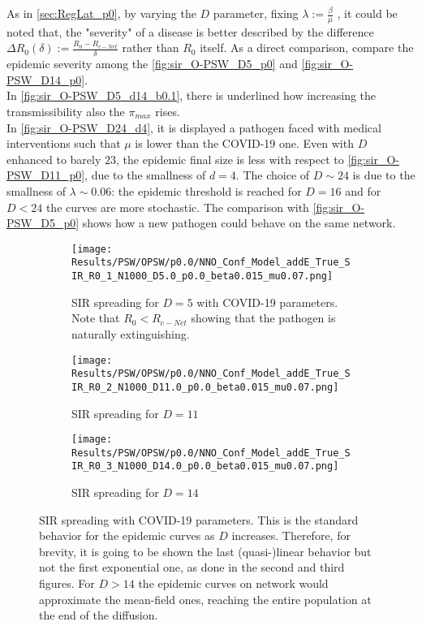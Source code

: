 \documentclass[a4paper,10pt,twoside]{book} %
\theoremstyle{definition}
\begin{document}
As in \autoref{sec:RegLat_p0}, by varying the $D$ parameter, fixing $\lambda:=\frac{\beta}{ \mu}$ , it could be noted that, the "severity" of a disease is better described by the difference $\Delta R_0 (\delta) := \frac{R_0 - R_{c-Net}}{\delta}$ rather than $R_0 $ itself. As a direct comparison, compare the epidemic severity among the \autoref{fig:sir_O-PSW_D5_p0} and \autoref{fig:sir_O-PSW_D14_p0}.\\
In \autoref{fig:sir_O-PSW_D5_d14_b0.1}, there is underlined how increasing the transmissibility also the $ \pi_{max}$ rises.\\
In \autoref{fig:sir_O-PSW_D24_d4}, it is displayed a pathogen faced with medical interventions such that $\mu$ is lower than the COVID-19 one. Even with $D$ enhanced to barely $23$, the epidemic final size is less with respect to \autoref{fig:sir_O-PSW_D11_p0}, due to the smallness of $ d = 4$. The choice of $D \sim 24$ is due to the smallness of $\lambda \sim 0.06$: the epidemic threshold is reached for $D = 16$ and for $D < 24$ the curves are more stochastic. The comparison with \autoref{fig:sir_O-PSW_D5_p0} shows how a new pathogen could behave on the same network.
\begin{figure}[p]
	\centering
    \begin{subfigure}[t]{\linewidth}
        \texttt{[image: Results/PSW/OPSW/p0.0/NNO\_Conf\_Model\_addE\_True\_SIR\_R0\_1\_N1000\_D5.0\_p0.0\_beta0.015\_mu0.07.png]}
		\centering
        \caption{SIR spreading for $D = 5$ with COVID-19 parameters. Note that $R_0 < R_{c-Net}$ showing that the pathogen is naturally extinguishing.}
        \label{fig:sir_O-PSW_D5_p0}
    \end{subfigure}
	\vfill
	\begin{subfigure}[b]{\linewidth}
		\centering
        \texttt{[image: Results/PSW/OPSW/p0.0/NNO\_Conf\_Model\_addE\_True\_SIR\_R0\_2\_N1000\_D11.0\_p0.0\_beta0.015\_mu0.07.png]}
        \caption{SIR spreading for $D = 11$}
        \label{fig:sir_O-PSW_D11_p0}
    \end{subfigure}
	\vfill
	\begin{subfigure}[b]{\linewidth}
		\centering
        \texttt{[image: Results/PSW/OPSW/p0.0/NNO\_Conf\_Model\_addE\_True\_SIR\_R0\_3\_N1000\_D14.0\_p0.0\_beta0.015\_mu0.07.png]}
        \caption{SIR spreading for $D = 14$}
        \label{fig:sir_O-PSW_D14_p0}
    \end{subfigure}
	\caption{SIR spreading with COVID-19 parameters. This is the standard behavior for the epidemic curves as $D$ increases. Therefore, for brevity, it is going to be shown the last (quasi-)linear behavior but not the first exponential one, as done in the second and third figures.
	For $D > 14$ the epidemic curves on network would approximate the mean-field ones, reaching the entire population at the end of the diffusion.}
	\label{fig:sir_O-PSW_COVID}
\end{figure}
\end{document}
